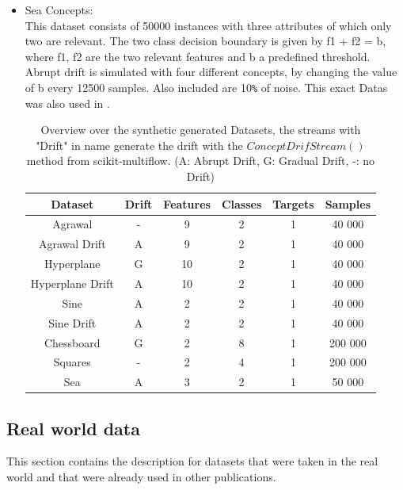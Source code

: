 \documentclass[12pt,oneside,a4paper,parskip]{scrbook}
\begin{document}
\begin{itemize}
  \item Sea Concepts: \\
        This dataset consists of 50000 instances with three attributes of which only two are relevant. 
        The two class decision boundary is given by f1 + f2 = b, where f1, f2 are the two relevant features and b a
        predefined threshold. Abrupt drift is simulated with four different concepts, by changing the value of b every 
        12500 samples. Also included are 10\verb|%| of noise. 
        This exact Datas was also used in \cite{SEADataset}.

        \begin{table}[H]
          \label{tab:realdata}
          \centering
          \begin{tabular} {|| c c c c c c ||} 
            \hline
              Dataset & Drift &Features & Classes & Targets & Samples \\
            \hline\hline
              Agrawal & - & 9 & 2 & 1 & 40 000 \\
            \hline
              Agrawal Drift & A & 9 & 2 & 1 & 40 000 \\
            \hline 
              Hyperplane & G & 10 & 2 & 1 & 40 000 \\
            \hline 
              Hyperplane Drift & A & 10 & 2 & 1 & 40 000 \\
            \hline
              Sine & A & 2 & 2 & 1 & 40 000 \\
            \hline
              Sine Drift & A & 2 & 2 & 1 & 40 000 \\
            \hline
              Chessboard & G & 2 & 8 & 1 & 200 000 \\
            \hline
              Squares & - & 2 & 4 & 1 & 200 000 \\
            \hline
              Sea & A & 3 & 2 & 1 & 50 000 \\
            \hline
          \end{tabular} 
          \caption{Overview over the synthetic generated Datasets, the streams with "Drift" in name generate the drift
          with the $ConceptDrifStream()$ method from scikit-multiflow. (A: Abrupt Drift, G: Gradual Drift, -: no Drift) }
        \end{table}
  
\end{itemize}

\subsection{Real world data}
This section contains the description for datasets that were taken in the real world and that were already used in other
publications. 
\end{document}
